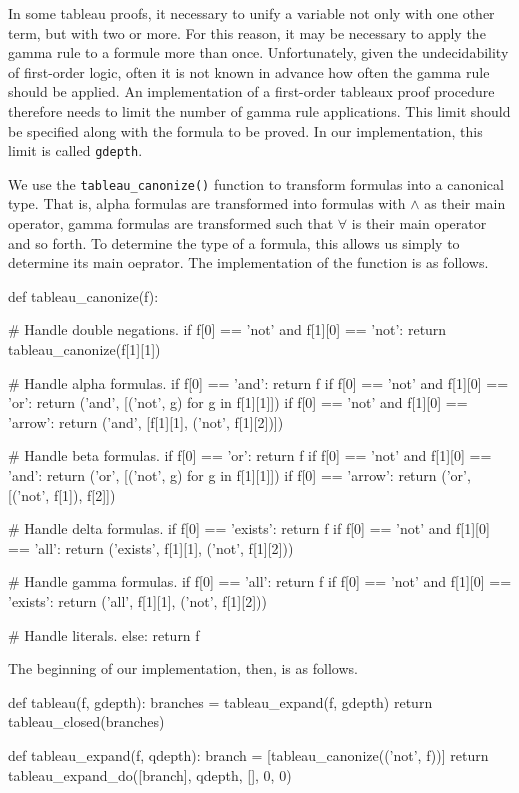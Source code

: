 \documentclass[a4paper,notitlepage]{scrartcl}
\begin{document}
In some tableau proofs, it necessary to unify a variable not only with one
other term, but with two or more. For this reason, it may be necessary to apply
the gamma rule to a formule more than once. Unfortunately, given the
undecidability of first-order logic, often it is not known in advance how often
the gamma rule should be applied. An implementation of a first-order tableaux
proof procedure therefore needs to limit the number of gamma rule applications.
This limit should be specified along with the formula to be proved. In our
implementation, this limit is called \texttt{gdepth}.

We use the \texttt{tableau\_canonize()} function to transform formulas into a
canonical type. That is, alpha formulas are transformed into formulas with
$\land$ as their main operator, gamma formulas are transformed such that
$\forall$ is their main operator and so forth. To determine the type of a
formula, this allows us simply to determine its main oeprator. The
implementation of the function is as follows.

\begin{code}
def tableau_canonize(f):

    # Handle double negations.
    if f[0] == 'not' and f[1][0] == 'not':
        return tableau_canonize(f[1][1])

    # Handle alpha formulas.
    if f[0] == 'and':
        return f 
    if f[0] == 'not' and f[1][0] == 'or':
        return ('and', [('not', g) for g in f[1][1]])
    if f[0] == 'not' and f[1][0] == 'arrow':
        return ('and', [f[1][1], ('not', f[1][2])])

    # Handle beta formulas.
    if f[0] == 'or':
        return f 
    if f[0] == 'not' and f[1][0] == 'and':
        return ('or', [('not', g) for g in f[1][1]])
    if f[0] == 'arrow':
        return ('or', [('not', f[1]), f[2]])

    # Handle delta formulas.
    if f[0] == 'exists':
        return f 
    if f[0] == 'not' and f[1][0] == 'all':
        return ('exists', f[1][1], ('not', f[1][2]))

    # Handle gamma formulas.
    if f[0] == 'all':
        return f
    if f[0] == 'not' and f[1][0] == 'exists':
        return ('all', f[1][1], ('not', f[1][2]))

    # Handle literals. 
    else:
        return f 
\end{code}

The beginning of our implementation, then, is as follows.

\begin{code}
def tableau(f, gdepth):
    branches = tableau_expand(f, gdepth)
    return tableau_closed(branches)

def tableau_expand(f, qdepth):
    branch = [tableau_canonize(('not', f))]
    return tableau_expand_do([branch], qdepth, [], 0, 0)
\end{code}
\end{document}
